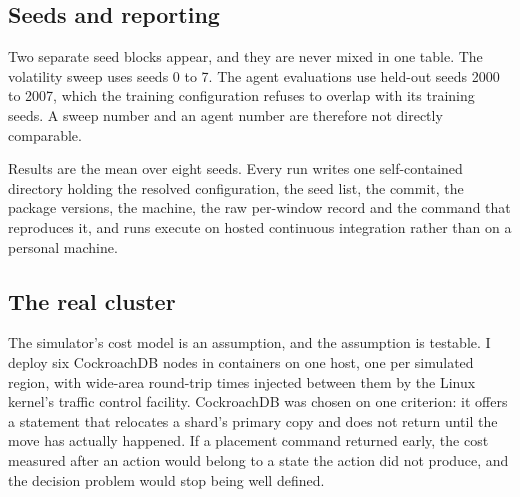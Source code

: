 \subsection{Seeds and reporting}

Two separate seed blocks appear, and they are never mixed in one table. The
volatility sweep uses seeds 0 to 7. The agent evaluations use held-out seeds
2000 to 2007, which the training configuration refuses to overlap with its
training seeds. A sweep number and an agent number are therefore not directly
comparable.

Results are the mean over eight seeds. Every run writes one
self-contained directory holding the resolved configuration, the seed list,
the commit, the package versions, the machine, the raw per-window record and
the command that reproduces it, and runs execute on hosted continuous
integration rather than on a personal machine.

\subsection{The real cluster}

The simulator's cost model is an assumption, and the assumption is testable.
I deploy six CockroachDB nodes in containers on one host, one per simulated
region, with wide-area round-trip times injected between them by the Linux
kernel's traffic control facility. CockroachDB was chosen on one criterion: it
offers a statement that relocates a shard's primary copy and does not return
until the move has actually happened. If a placement command returned early,
the cost measured after an action would belong to a state the action did not
produce, and the decision problem would stop being well defined.
